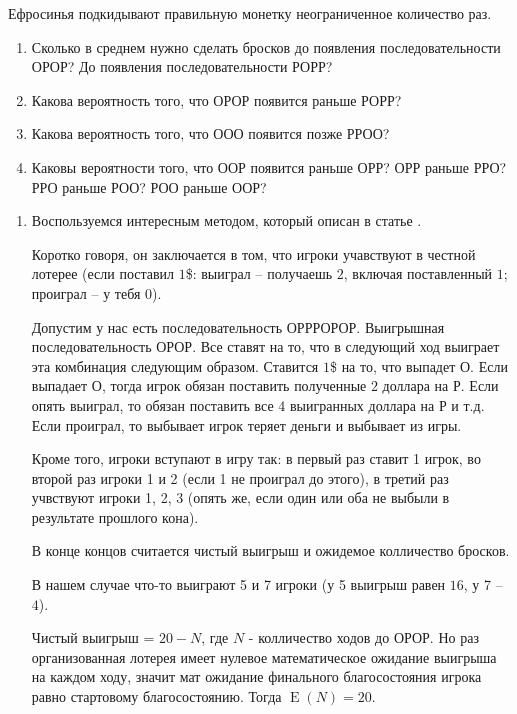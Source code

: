 \documentclass[nobib]{tufte-handout}
\theoremstyle{definition}
\newcounter{problem}
\newenvironment{problem}%
{%
\refstepcounter{problem}%
     \hypertarget{problem:{\theproblem}}{}
     \Writetofile{solution_file}{\protect\hypertarget{soln:\theproblem}{}}
     \begin{myenum}[label=\bfseries\protect\hyperlink{soln:\theproblem}{\theproblem},ref=\theproblem]
     \item%
    }%
    {%
    \end{myenum}}
\DeclareMathOperator{\E}{E}
\begin{document}
\begin{problem}
Ефросинья подкидывают правильную монетку неограниченное количество раз.

\begin{enumerate}
\item Сколько в среднем нужно сделать бросков до появления последовательности ОРОР? До появления последовательности РОРР?
\item Какова вероятность того, что ОРОР появится раньше РОРР?
\item Какова вероятность того, что ООО появится позже РРОО?
\item Каковы вероятности того, что ООР появится раньше ОРР? ОРР раньше РРО? РРО раньше РОО? РОО раньше ООР?
\end{enumerate}

\begin{sol}
\begin{enumerate}
\item Воспользуемся интересным методом, который описан в статье \cite{li1980martingale}.

Коротко говоря, он заключается в том, что игроки учавствуют в честной лотерее (если поставил $1$\$: выиграл – получаешь $2$, включая поставленный $1$; проиграл – у тебя $0$).

Допустим у нас есть последовательность ОРРРОРОР. Выигрышная последовательность ОРОР. Все ставят на то, что в следующий ход выиграет эта комбинация следующим образом. Ставится $1$\$ на то, что выпадет О. Если выпадает О, тогда игрок обязан поставить полученные $2$ доллара на Р. Если опять выиграл, то обязан поставить все $4$ выигранных доллара на Р и т.д. Если проиграл, то выбывает игрок теряет деньги и выбывает из игры.

Кроме того, игроки вступают в игру так: в первый раз ставит 1 игрок, во второй раз игроки 1 и 2 (если 1 не проиграл до этого), в третий раз учвствуют игроки 1,  2, 3 (опять же, если один или оба не выбыли в результате прошлого кона).

В конце концов считается чистый выигрыш и ожидемое колличество бросков.

В нашем случае что-то выиграют 5 и 7 игроки (у 5 выигрыш равен $16$, у 7 – $4$).

Чистый выигрыш = $20 - N$, где $N$ - колличество ходов до ОРОР. Но раз организованная лотерея имеет нулевое математическое ожидание выигрыша на каждом ходу, значит мат ожидание финального благосостояния игрока равно стартовому благосостоянию. Тогда $\E(N) = 20$.


\end{enumerate}
\end{sol}
\end{problem}
\end{document}
